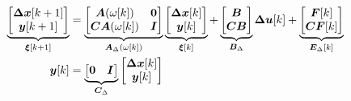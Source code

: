 \begin{equation}
	\begin{split}
		\underbrace{
			\begin{bmatrix}
				\bm{\Delta x}[k+1] \\
				\bm{y}[k+1]
			\end{bmatrix}
		}_{\bm{\xi}[k+1]}
		&=
		\underbrace{
			\begin{bmatrix}
				\bm{A}(\omega[k]) & \bm{0} \\
				\bm{C} \bm{A}(\omega[k]) & \bm{I}
			\end{bmatrix}
		}_{\bm{A}_{\Delta}(\omega[k])}
		\underbrace{
			\begin{bmatrix}
				\bm{\Delta x}[k] \\
				\bm{y}[k]
			\end{bmatrix}
		}_{\bm{\xi}[k]}
		+
		\underbrace{
			\begin{bmatrix}
				\bm{B} \\
				\bm{C}\bm{B}
			\end{bmatrix}
		}_{\bm{B}_{\Delta}}
		\bm{\Delta u}[k]
			+ 
		\underbrace{
			\begin{bmatrix}
				\bm{F} [k]  \\
				\bm{C} \bm{F} [k] 
		\end{bmatrix}
		}_{\bm{E}_{\Delta} [k]}
		\\
		\bm{y}[k]
		&=
		\underbrace{
			\begin{bmatrix}
				\bm{0} & \bm{I}
			\end{bmatrix}
		}_{\bm{C}_{\Delta}}
		\begin{bmatrix}
			\bm{\Delta x}[k] \\
			\bm{y}[k]
		\end{bmatrix}
	\end{split}
	\label{equ:2_augmented_pmsm}
\end{equation}

